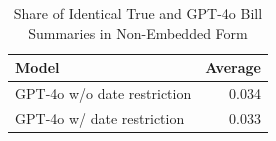 \begin{table}[!h]
\centering
\caption{Share of Identical True and GPT-4o Bill Summaries in Non-Embedded Form}
\centering
\begin{tabular}[t]{lr}
\toprule
Model & Average\\
\midrule
GPT-4o w/o date restriction & 0.034\\
GPT-4o w/ date restriction & 0.033\\
\bottomrule
\end{tabular}
\end{table}
